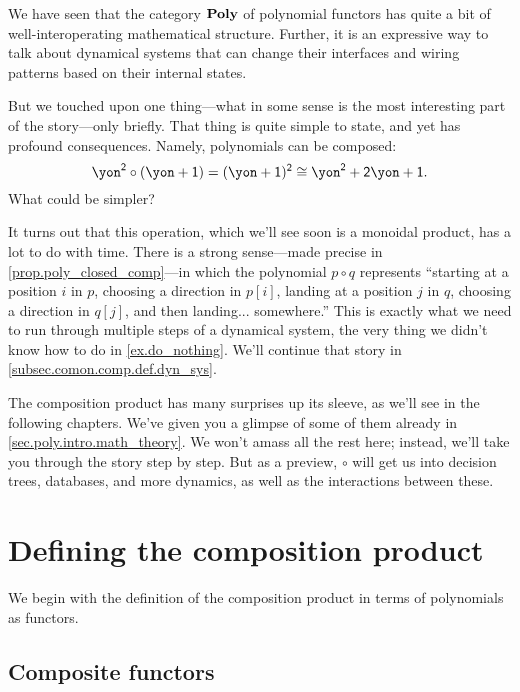 \documentclass[Book-Poly]{subfiles}
\begin{document}





We have seen that the category $\mathbf{Poly}$ of polynomial functors has quite a bit of well-interoperating mathematical structure. Further, it is an expressive way to talk about dynamical systems that can change their interfaces and wiring patterns based on their internal states.

But we touched upon one thing---what in some sense is the most interesting part of the story---only briefly. That thing is quite simple to state, and yet has profound consequences. Namely, polynomials can be composed:
\[
\yon^\2\circ(\yon+\1)=(\yon+\1)^\2\iso\yon^\2+\2\yon+\1.
\]
What could be simpler?

It turns out that this operation, which we'll see soon is a monoidal product, has a lot to do with time.
There is a strong sense---made precise in \cref{prop.poly_closed_comp}---in which the polynomial $p\circ q$ represents ``starting at a position $i$ in $p$, choosing a direction in $p[i]$, landing at a position $j$ in $q$, choosing a direction in $q[j]$, and then landing... somewhere.''
This is exactly what we need to run through multiple steps of a dynamical system, the very thing we didn't know how to do in \cref{ex.do_nothing}.
We'll continue that story in \cref{subsec.comon.comp.def.dyn_sys}.

The composition product has many surprises up its sleeve, as we'll see in the following chapters.
We've given you a glimpse of some of them already in \cref{sec.poly.intro.math_theory}.
We won't amass all the rest here; instead, we'll take you through the story step by step.
But as a preview, $\circ$ will get us into decision trees, databases, and more dynamics, as well as the interactions between these.

\section{Defining the composition product}\label{sec.comon.comp.def}
We begin with the definition of the composition product in terms of polynomials as functors.

\subsection{Composite functors}\label{subsec.comon.comp.def.functor}
\end{document}
